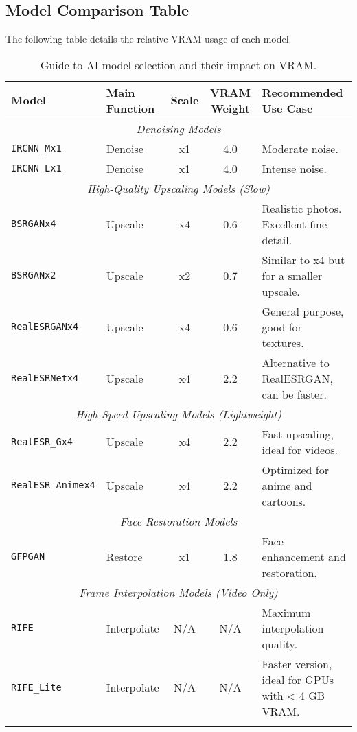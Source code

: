 \documentclass[11pt, a4paper]{article}
\begin{document}
\subsection{Model Comparison Table}
The following table details the relative VRAM usage of each model.
\begin{longtable}{l l c c p{6.5cm}}
\toprule
\textbf{Model} & \textbf{Main Function} & \textbf{Scale} & \textbf{VRAM Weight} & \textbf{Recommended Use Case} \\
\midrule
\endhead %

\multicolumn{5}{c}{\textit{Denoising Models}} \\
\midrule
\texttt{IRCNN\_Mx1} & Denoise & x1 & 4.0 & Moderate noise. \\
\texttt{IRCNN\_Lx1} & Denoise & x1 & 4.0 & Intense noise. \\
\midrule
\multicolumn{5}{c}{\textit{High-Quality Upscaling Models (Slow)}} \\
\midrule
\texttt{BSRGANx4} & Upscale & x4 & 0.6 & Realistic photos. Excellent fine detail. \\
\texttt{BSRGANx2} & Upscale & x2 & 0.7 & Similar to x4 but for a smaller upscale. \\
\texttt{RealESRGANx4} & Upscale & x4 & 0.6 & General purpose, good for textures. \\
\texttt{RealESRNetx4} & Upscale & x4 & 2.2 & Alternative to RealESRGAN, can be faster. \\
\midrule
\multicolumn{5}{c}{\textit{High-Speed Upscaling Models (Lightweight)}} \\
\midrule
\texttt{RealESR\_Gx4} & Upscale & x4 & 2.2 & Fast upscaling, ideal for videos. \\
\texttt{RealESR\_Animex4} & Upscale & x4 & 2.2 & Optimized for anime and cartoons. \\
\midrule
\multicolumn{5}{c}{\textit{Face Restoration Models}} \\
\midrule
\texttt{GFPGAN} & Restore & x1 & 1.8 & Face enhancement and restoration. \\
\midrule
\multicolumn{5}{c}{\textit{Frame Interpolation Models (Video Only)}} \\
\midrule
\texttt{RIFE} & Interpolate & N/A & N/A & Maximum interpolation quality. \\
\texttt{RIFE\_Lite} & Interpolate & N/A & N/A & Faster version, ideal for GPUs with < 4 GB VRAM. \\
\bottomrule
\caption{Guide to AI model selection and their impact on VRAM.}
\label{tab:modelos} %
\end{longtable}
\end{document}
